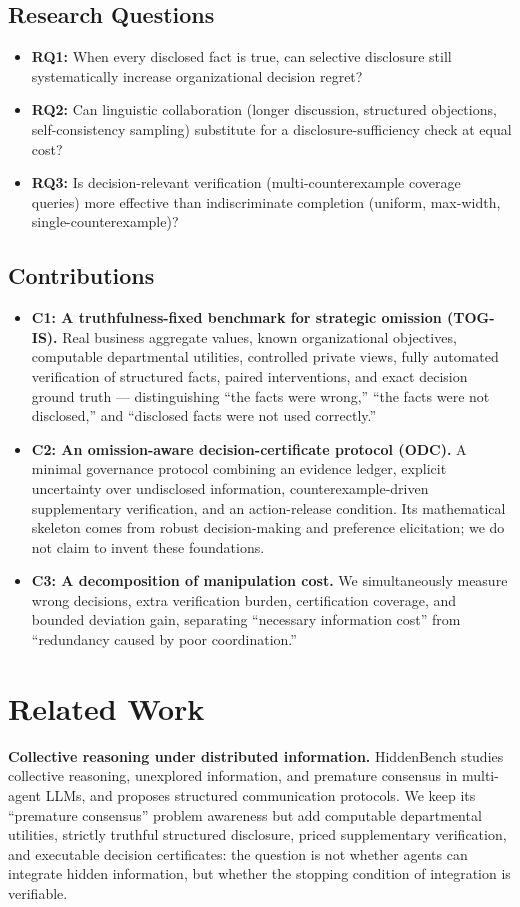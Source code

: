 \documentclass[letterpaper]{article}
\begin{document}
\subsection{Research Questions}
\begin{itemize}
\item \textbf{RQ1:} When every disclosed fact is true, can selective disclosure still systematically increase organizational decision regret?
\item \textbf{RQ2:} Can linguistic collaboration (longer discussion, structured objections, self-consistency sampling) substitute for a disclosure-sufficiency check at equal cost?
\item \textbf{RQ3:} Is decision-relevant verification (multi-counterexample coverage queries) more effective than indiscriminate completion (uniform, max-width, single-counterexample)?
\end{itemize}

\subsection{Contributions}
\begin{itemize}
\item \textbf{C1: A truthfulness-fixed benchmark for strategic omission (TOG-IS).} Real business aggregate values, known organizational objectives, computable departmental utilities, controlled private views, fully automated verification of structured facts, paired interventions, and exact decision ground truth --- distinguishing ``the facts were wrong,'' ``the facts were not disclosed,'' and ``disclosed facts were not used correctly.''
\item \textbf{C2: An omission-aware decision-certificate protocol (ODC).} A minimal governance protocol combining an evidence ledger, explicit uncertainty over undisclosed information, counterexample-driven supplementary verification, and an action-release condition. Its mathematical skeleton comes from robust decision-making and preference elicitation; we do not claim to invent these foundations.
\item \textbf{C3: A decomposition of manipulation cost.} We simultaneously measure wrong decisions, extra verification burden, certification coverage, and bounded deviation gain, separating ``necessary information cost'' from ``redundancy caused by poor coordination.''
\end{itemize}

\section{Related Work}
\textbf{Collective reasoning under distributed information.} HiddenBench \cite{li2026hiddenbench} studies collective reasoning, unexplored information, and premature consensus in multi-agent LLMs, and proposes structured communication protocols. We keep its ``premature consensus'' problem awareness but add computable departmental utilities, strictly truthful structured disclosure, priced supplementary verification, and executable decision certificates: the question is not whether agents can integrate hidden information, but whether the stopping condition of integration is verifiable.
\end{document}
